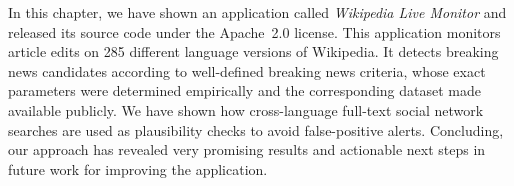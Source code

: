 In this chapter, we have shown an application called \emph{Wikipedia Live Monitor}
and released its source code under the Apache~2.0 license.
This application monitors article edits on 285 different language versions of Wikipedia.
It detects breaking news candidates according to well-defined breaking news criteria,
whose exact parameters were determined empirically
and the corresponding dataset made available publicly.
We have shown how cross-language full-text social network searches are used
as plausibility checks to avoid false-positive alerts.
Concluding, our approach has revealed very promising results
and actionable next steps in future work
for improving the application.



